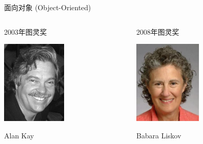 \documentclass[]{beamer}
\begin{document}
\begin{frame}{面向对象 (Object-Oriented)}
  \begin{columns}
    \begin{column}{.33\textwidth}
      \begin{block}{2003年图灵奖}
        \begin{center}
          \includegraphics[height=4cm]{kay.jpg}

          Alan Kay
        \end{center}
      \end{block}
    \end{column}
    \begin{column}{.33\textwidth}
      \begin{block}{2008年图灵奖}
        \begin{center}
          \includegraphics[height=4cm]{liskov.jpg}

          Babara Liskov
        \end{center}
      \end{block}
    \end{column}
  \end{columns}
\end{frame}
\end{document}
